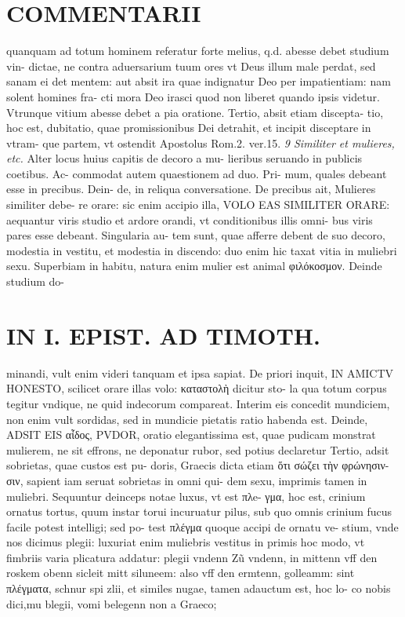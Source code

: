 \documentclass{article}
\begin{document}
\begin{pages}
\section*{COMMENTARII }
\marginpar{[ p.5 ]}\pstart quanquam ad totum hominem referatur forte melius, q.d. abesse debet studium vin- dictae, ne contra aduersarium tuum ores vt Deus illum male perdat, sed sanam ei det mentem: aut absit ira quae indignatur Deo per impatientiam: nam solent homines fra- cti mora Deo irasci quod non liberet quando ipsis videtur. Vtrunque vitium abesse debet a pia oratione. Tertio, absit etiam discepta- tio, hoc est, dubitatio, quae promissionibus Dei detrahit, et incipit disceptare in vtram- que partem, vt ostendit Apostolus Rom.2. ver.15.  \pend
\textit{9 Similiter et mulieres, etc. }\pstart Alter locus huius capitis de decoro a mu- lieribus seruando in publicis coetibus. Ac- commodat autem quaestionem ad duo. Pri- mum, quales debeant esse in precibus. Dein- de, in reliqua conversatione.  \pend\pstart De precibus ait, Mulieres similiter debe- re orare: sic enim accipio illa, VOLO EAS SIMILITER ORARE: aequantur viris studio et ardore orandi, vt conditionibus illis omni- bus viris pares esse debeant. Singularia au- tem sunt, quae afferre debent de suo decoro, modestia in vestitu, et modestia in discendo: duo enim hic taxat vitia in muliebri sexu. Superbiam in habitu, natura enim mulier est animal φιλόκοσμον. Deinde studium do-  \pend
\section*{IN I. EPIST. AD TIMOTH. }
\marginpar{[ p.55 ]}\pstart minandi, vult enim videri tanquam et ipsa sapiat.  \pend\pstart De priori inquit, IN AMICTV HONESTO, scilicet orare illas volo: καταστολὴ dicitur sto- la qua totum corpus tegitur vndique, ne quid indecorum compareat. Interim eis concedit mundiciem, non enim vult sordidas, sed in mundicie pietatis ratio habenda est.  \pend\pstart Deinde, ADSIT EIS αἶδος, PVDOR, oratio elegantissima est, quae pudicam monstrat mulierem, ne sit effrons, ne deponatur rubor, sed potius declaretur  \pend\pstart Tertio, adsit sobrietas, quae custos est pu- doris, Graecis dicta etiam ὅτι σώζει τὴν φρώνησιν- σιν, sapient iam seruat sobrietas in omni qui- dem sexu, imprimis tamen in muliebri.  \pend\pstart Sequuntur deinceps notae luxus, vt est πλe- γμα, hoc est, crinium ornatus tortus, quum instar torui incuruatur pilus, sub quo omnis crinium fucus facile potest intelligi; sed po- test πλέγμα quoque accipi de ornatu ve- stium, vnde nos dicimus plegii: luxuriat enim muliebris vestitus in primis hoc modo, vt fimbriis varia plicatura addatur: plegii vndenn Zũ vndenn, in mittenn vff den roskem obenn sicleit mitt siluneem: also vff den ermtenn, golleamm: sint πλέγματα, schnur spi zlii, et similes nugae, tamen adauctum est, hoc lo- co nobis dici,mu blegii, vomi belegenn non a Graeco;  \pend
\marginpar{[ p.56 ]}

\end{pages}
\end{document}
